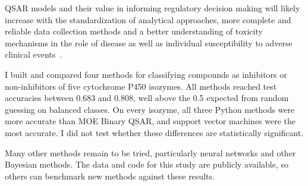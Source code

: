 

QSAR models and their value in informing regulatory decision making will likely increase with the standardization of analytical approaches, more complete and reliable data collection methods and a better understanding of toxicity mechanisms in the role of disease as well as individual susceptibility to adverse clinical events~\cite{Kruhlak2012}.

I built and compared four methods for classifying compounds as inhibitors or non-inhibitors of five cytochrome P450 isozymes. All methods reached test accuracies between 0.683 and 0.808, well above the 0.5 expected from random guessing on balanced classes. On every isozyme, all three Python methods were more accurate than MOE Binary QSAR, and support vector machines were the most accurate. I did not test whether these differences are statistically significant.

Many other methods remain to be tried, particularly neural networks and other Bayesian methods. The data and code for this study are publicly available, so others can benchmark new methods against these results.


